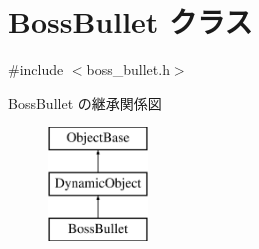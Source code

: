 \hypertarget{class_boss_bullet}{}\section{Boss\+Bullet クラス}
\label{class_boss_bullet}


{\ttfamily \#include $<$boss\+\_\+bullet.\+h$>$}

Boss\+Bullet の継承関係図\begin{figure}[H]
\begin{center}
\leavevmode
\includegraphics[height=3.000000cm]{class_boss_bullet}
\end{center}
\end{figure}
